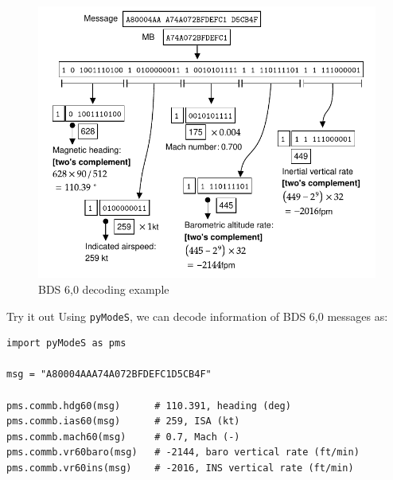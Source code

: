 \begin{figure}[ht]
  \centering
  \includegraphics[scale=0.9]{figures/mode_s/bds60_example.pdf}
  \caption{BDS 6,0 decoding example}
  \label{fig:bds60_example}
\end{figure}

\begin{notebox}{Try it out}
Using \texttt{pyModeS}, we can decode information of BDS 6,0 messages as: 

\begin{verbatim}
import pyModeS as pms

msg = "A80004AAA74A072BFDEFC1D5CB4F"

pms.commb.hdg60(msg)      # 110.391, heading (deg)
pms.commb.ias60(msg)      # 259, ISA (kt)
pms.commb.mach60(msg)     # 0.7, Mach (-)
pms.commb.vr60baro(msg)   # -2144, baro vertical rate (ft/min)
pms.commb.vr60ins(msg)    # -2016, INS vertical rate (ft/min)
\end{verbatim}

\end{notebox}
